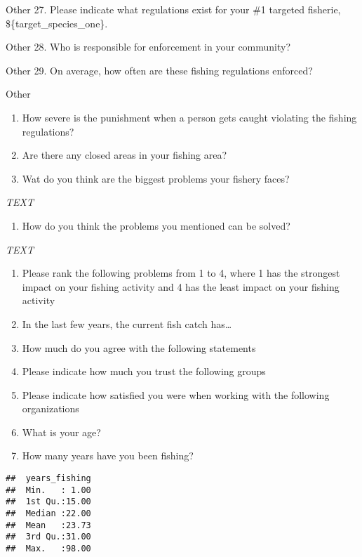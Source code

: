 \documentclass[]{article}
\providecommand{\tightlist}{%
  \setlength{\itemsep}{0pt}\setlength{\parskip}{0pt}}
\begin{document}
Other 27. Please indicate what regulations exist for your \#1 targeted
fisherie, \$\{target\_species\_one\}.

Other 28. Who is responsible for enforcement in your community?

Other 29. On average, how often are these fishing regulations enforced?

Other

\begin{enumerate}
\def\labelenumi{\arabic{enumi}.}
\setcounter{enumi}{29}
\item
  How severe is the punishment when a person gets caught violating the
  fishing regulations?
\item
  Are there any closed areas in your fishing area?
\item
  Wat do you think are the biggest problems your fishery faces?
\end{enumerate}

\emph{TEXT}

\begin{enumerate}
\def\labelenumi{\arabic{enumi}.}
\setcounter{enumi}{32}
\tightlist
\item
  How do you think the problems you mentioned can be solved?
\end{enumerate}

\emph{TEXT}

\begin{enumerate}
\def\labelenumi{\arabic{enumi}.}
\setcounter{enumi}{33}
\item
  Please rank the following problems from 1 to 4, where 1 has the
  strongest impact on your fishing activity and 4 has the least impact
  on your fishing activity
\item
  In the last few years, the current fish catch has\ldots{}
\item
  How much do you agree with the following statements
\item
  Please indicate how much you trust the following groups
\item
  Please indicate how satisfied you were when working with the following
  organizations
\item
  What is your age?
\item
  How many years have you been fishing?
\end{enumerate}

\begin{verbatim}
##  years_fishing  
##  Min.   : 1.00  
##  1st Qu.:15.00  
##  Median :22.00  
##  Mean   :23.73  
##  3rd Qu.:31.00  
##  Max.   :98.00
\end{verbatim}
\end{document}
